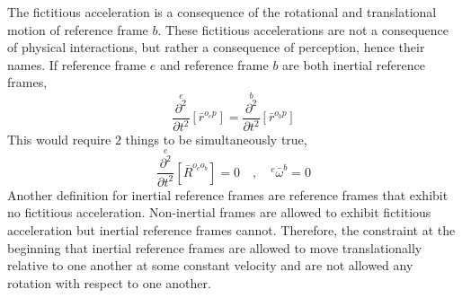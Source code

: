 The fictitious acceleration is a consequence of the rotational and translational motion of reference frame $b$. 
These fictitious accelerations are not a consequence of physical interactions, but rather a consequence of perception, hence their names. 
If reference frame $e$ and reference frame $b$ are both inertial reference frames, 
$$\overset{e}{\frac{\partial^{2}}{\partial t^{2}}}[\bar{r}^{o_{e}p}] =  \overset{b}{\frac{\partial^{2}}{\partial t^{2}}}[\bar{r}^{o_{b}p}]$$
This would require $2$ things to be simultaneously true,
$$\overset{e}{\frac{\partial^{2}}{\partial t^{2}}}[\bar{R}^{o_{e}o_{b}}] = 0 \quad,\quad {}^{e}\bar{\omega}^{b} = 0$$
Another definition for inertial reference frames are reference frames that exhibit no fictitious acceleration. 
Non-inertial frames are allowed to exhibit fictitious acceleration but inertial reference frames cannot. 
Therefore, the constraint at the beginning that inertial reference frames are allowed to move translationally relative to one another at some constant velocity and are not allowed any rotation with respect to one another.

